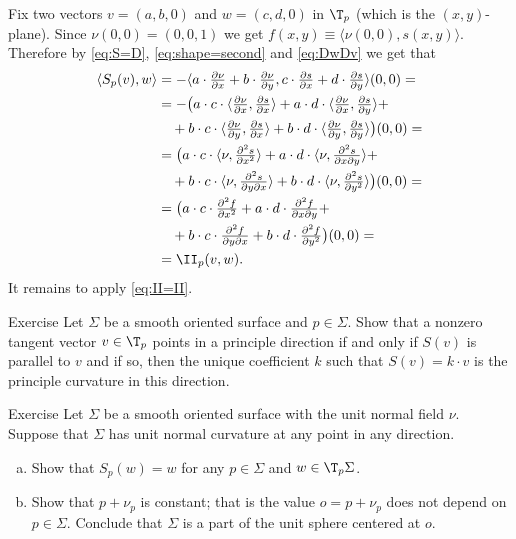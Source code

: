 Fix two vectors $v=(a,b,0)$ and $w=(c,d,0)$ in $\T_p$ (which is the $(x,y)$-plane).
Since $\nu(0,0)=(0,0,1)$ we get $f(x,y)\equiv\langle\nu(0,0),s(x,y)\rangle$.
Therefore by \ref{eq:S=D}, \ref{eq:shape=second} and \ref{eq:DwDv} we get that 
\begin{align*}
\langle S_p(v),w\rangle 
&=-\langle  a\cdot \tfrac{\partial \nu}{\partial x}+b\cdot \tfrac{\partial \nu}{\partial y},c\cdot \tfrac{\partial s}{\partial x}+d\cdot \tfrac{\partial s}{\partial y}\rangle(0,0)=
\\
&=-\bigl(a\cdot c\cdot\langle \tfrac{\partial \nu}{\partial x},\tfrac{\partial s}{\partial x}\rangle 
+a\cdot d\cdot\langle \tfrac{\partial \nu}{\partial x},\tfrac{\partial s}{\partial y}\rangle+
\\&\quad
+b\cdot c\cdot\langle \tfrac{\partial \nu}{\partial y},\tfrac{\partial s}{\partial x}\rangle
+b\cdot d\cdot\langle \tfrac{\partial \nu}{\partial y},\tfrac{\partial s}{\partial y}\rangle\bigr)(0,0)=
\\
&=\bigl(a\cdot c\cdot\langle \nu,\tfrac{\partial^2 s}{\partial x^2}\rangle 
+a\cdot d\cdot\langle \nu,\tfrac{\partial^2 s}{\partial x\partial y}\rangle+
\\&\quad
+b\cdot c\cdot\langle \nu,\tfrac{\partial^2 s}{\partial y\partial x}\rangle
+b\cdot d\cdot\langle \nu,\tfrac{\partial^2 s}{\partial y^2}\rangle\bigr)(0,0)=
\\
&=\bigl(a\cdot c\cdot\tfrac{\partial^2 f}{\partial x^2} 
+a\cdot d\cdot\tfrac{\partial^2 f}{\partial x\partial y}+
\\&\quad
+b\cdot c\cdot\tfrac{\partial^2 f}{\partial y\partial x}
+b\cdot d\cdot\tfrac{\partial^2 f}{\partial y^2}\bigr)(0,0)=
\\
&=\II_p(v,w).
\end{align*}
It remains to apply \ref{eq:II=II}.
\qeds

\begin{thm}{Exercise}
Let $\Sigma$ be a smooth oriented surface and $p\in \Sigma$.
Show that a nonzero tangent vector $v\in \T_p$ points in a principle direction
if and only if $S(v)$ is parallel to $v$ and if so, then the unique coefficient $k$ such that
$S(v)=k\cdot v$ is the principle curvature in this direction.
\end{thm}


\begin{thm}{Exercise}\label{ex:normal-curvature=const}
Let $\Sigma$ be a smooth oriented surface with the unit normal field $\nu$.
Suppose that $\Sigma$ has unit normal curvature at any point in any direction.
\begin{enumerate}[(a)]
 \item Show that $S_p(w)=w$ for any $p\in\Sigma$ and $w\in \T_p\Sigma$.
 \item Show that $p+\nu_p$ is constant; that is the value $o=p+\nu_p$ does not depend on $p\in\Sigma$.
 Conclude that $\Sigma$ is a part of the unit sphere centered at $o$.
\end{enumerate}

\end{thm}


